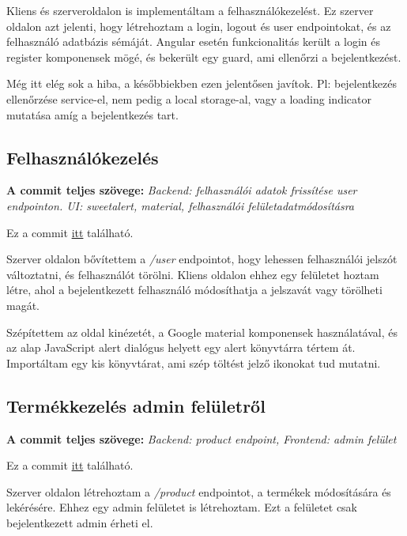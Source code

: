 \documentclass[]{article}
\begin{document}
Kliens és szerveroldalon is implementáltam a felhasználókezelést. Ez szerver oldalon azt jelenti, hogy létrehoztam a login, logout és user endpointokat, és az felhasználó adatbázis sémáját. Angular esetén funkcionalitás került a login és register komponensek mögé, és bekerült egy guard, ami ellenőrzi a bejelentkezést.

Még itt elég sok a hiba, a későbbiekben ezen jelentősen javítok. Pl: bejelentkezés ellenőrzése service-el, nem pedig a local storage-al, vagy a loading indicator mutatása amíg a bejelentkezés tart.

\subsection{Felhasználókezelés}

\noindent
\textbf{A commit teljes szövege:} \textit{Backend: felhasználói adatok frissítése user endpointon. UI: sweetalert, material, felhasználói felületadatmódosításra}

\bigskip
\noindent
Ez a commit \href{https://github.com/Gtomika/prf-project/commit/6794668ee38e4793fa249915b7df71481f39e519}{itt} található.
\bigskip

Szerver oldalon bővítettem a \textit{/user} endpointot, hogy lehessen felhasználói jelszót változtatni, és felhasználót törölni. Kliens oldalon ehhez egy felületet hoztam létre, ahol a bejelentkezett felhasználó módosíthatja a jelszavát vagy törölheti magát.

Szépítettem az oldal kinézetét, a Google material komponensek használatával, és az alap JavaScript alert dialógus helyett egy alert könyvtárra tértem át. Importáltam egy kis könyvtárat, ami szép töltést jelző ikonokat tud mutatni.

\subsection{Termékkezelés admin felületről}

\noindent
\textbf{A commit teljes szövege:} \textit{Backend: product endpoint, Frontend: admin felület}

\bigskip
\noindent
Ez a commit \href{https://github.com/Gtomika/prf-project/commit/f592c43be14ac39f53c4aa99b7b46c60c5b0640c}{itt} található.
\bigskip

Szerver oldalon létrehoztam a \textit{/product} endpointot, a termékek módosítására és lekérésére. Ehhez egy admin felületet is létrehoztam. Ezt a felületet csak bejelentkezett admin érheti el. 
\end{document}
